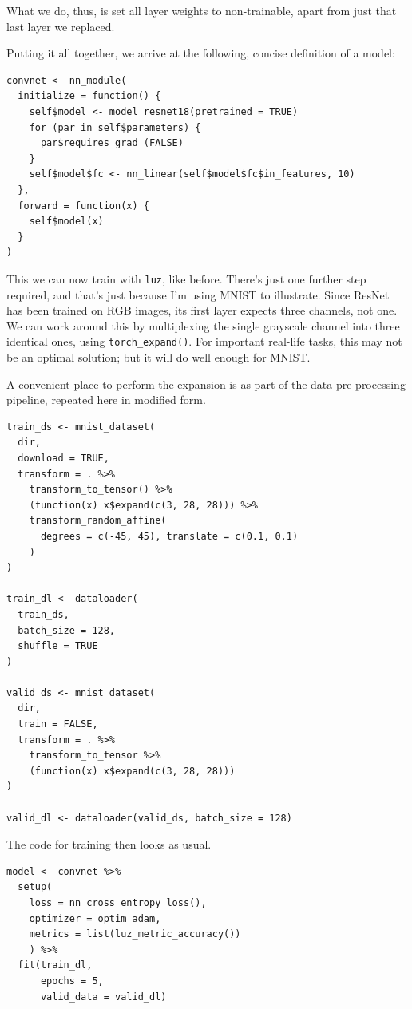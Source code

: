 \documentclass[
  letterpaper,
]{krantz}
\begin{document}
What we do, thus, is set all layer weights to non-trainable, apart from
just that last layer we replaced.

Putting it all together, we arrive at the following, concise definition
of a model:

\begin{verbatim}
convnet <- nn_module(
  initialize = function() {
    self$model <- model_resnet18(pretrained = TRUE)
    for (par in self$parameters) {
      par$requires_grad_(FALSE)
    }
    self$model$fc <- nn_linear(self$model$fc$in_features, 10)
  },
  forward = function(x) {
    self$model(x)
  }
)
\end{verbatim}

This we can now train with \texttt{luz}, like before. There's just one
further step required, and that's just because I'm using MNIST to
illustrate. Since ResNet has been trained on RGB images, its first layer
expects three channels, not one. We can work around this by multiplexing
the single grayscale channel into three identical ones, using
\texttt{torch\_expand()}. For important real-life tasks, this may not be
an optimal solution; but it will do well enough for MNIST.

A convenient place to perform the expansion is as part of the data
pre-processing pipeline, repeated here in modified form.

\begin{verbatim}
train_ds <- mnist_dataset(
  dir,
  download = TRUE,
  transform = . %>%
    transform_to_tensor() %>%
    (function(x) x$expand(c(3, 28, 28))) %>%
    transform_random_affine(
      degrees = c(-45, 45), translate = c(0.1, 0.1)
    )
)

train_dl <- dataloader(
  train_ds,
  batch_size = 128,
  shuffle = TRUE
)

valid_ds <- mnist_dataset(
  dir,
  train = FALSE,
  transform = . %>%
    transform_to_tensor %>%
    (function(x) x$expand(c(3, 28, 28)))
)

valid_dl <- dataloader(valid_ds, batch_size = 128)
\end{verbatim}

The code for training then looks as usual.

\begin{verbatim}
model <- convnet %>%
  setup(
    loss = nn_cross_entropy_loss(),
    optimizer = optim_adam,
    metrics = list(luz_metric_accuracy())
    ) %>%
  fit(train_dl,
      epochs = 5,
      valid_data = valid_dl)
\end{verbatim}
\end{document}
